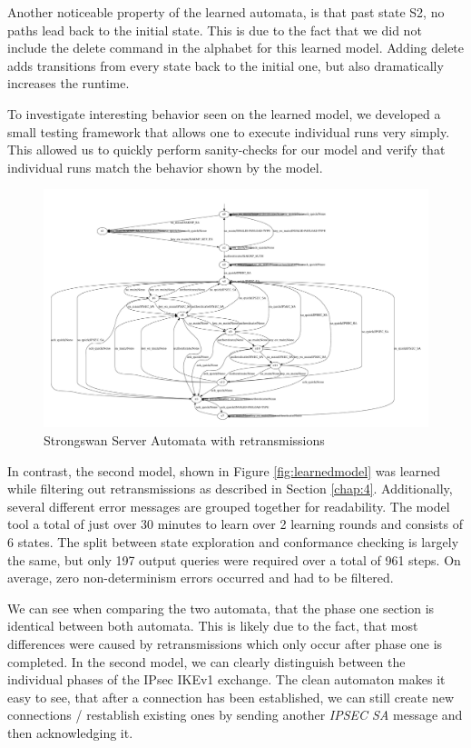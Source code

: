 \documentclass[runningheads]{llncs}
\begin{document}
Another noticeable property of the learned automata, is that past state S2, no paths lead back to the initial state. This is due to the fact that we did not include the delete command in the alphabet for this learned model. Adding delete adds transitions from every state back to the initial one, but also dramatically increases the runtime.

To investigate interesting behavior seen on the learned model, we developed a small testing framework that allows one to execute individual runs very simply. This allowed us to quickly perform sanity-checks for our model and verify that individual runs match the behavior shown by the model. 


\begin{figure}[!h]
	\centering
	\includegraphics[width=1\linewidth]{LearnedModelRet}
	\caption[Learned Model]{Strongswan Server Automata with retransmissions}
	\label{fig:learnedmodelret}
\end{figure}

In contrast, the second model, shown in Figure \ref{fig:learnedmodel} was learned while filtering out retransmissions as described in Section \ref{chap:4}. Additionally, several different error messages are grouped together for readability. The model tool a total of just over 30 minutes to learn over 2 learning rounds and consists of 6 states. The split between state exploration and conformance checking is largely the same, but only 197 output queries were required over a total of 961 steps. On average, zero non-determinism errors occurred and had to be filtered.

We can see when comparing the two automata, that the phase one section is identical between both automata. This is likely due to the fact, that most differences were caused by retransmissions which only occur after phase one is completed. In the second model, we can clearly distinguish between the individual phases of the IPsec IKEv1 exchange. The clean automaton makes it easy to see, that after a connection has been established, we can still create new connections / restablish existing ones by sending another \emph{IPSEC SA} message and then acknowledging it.
\end{document}
